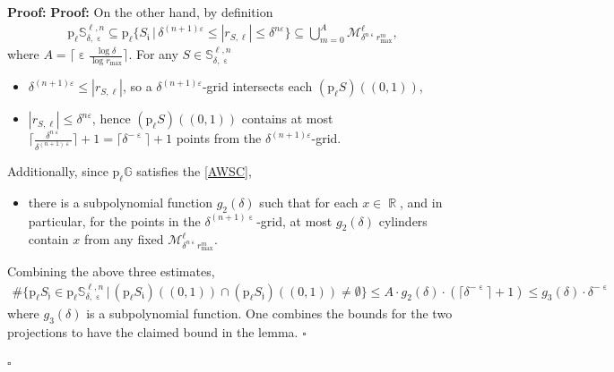 \documentclass[a4paper, 11pt]{article}
\newenvironment{Proof}{\noindent \textbf{Proof:}}{\hfill$\square$\\}
\DeclareMathOperator{\R}{\mathbb{R}}
\DeclareMathOperator{\iii}{\mathfrak{i}}
\DeclareMathOperator{\jjj}{\mathfrak{j}}
\DeclareMathOperator{\eps}{\varepsilon}
\numberwithin{equation}{section}
\theoremstyle{plain}
\theoremstyle{remark}
\theoremstyle{definition}
\begin{document}
\begin{Proof}
\begin{Proof}
On the other hand, by definition
\begin{align*}
\mathrm{p}_{\ell}\mathbb{S}_{\delta, \eps}^{\ell, n} \subseteq \mathrm{p}_{\ell}\big\{S_{\iii}\, \big|\, \delta^{(n+1)\varepsilon}\leq|r_{S,\ell}|\leq\delta^{n\varepsilon} \big\} \subseteq \bigcup_{m = 0}^{A}\mathcal{M}_{\delta^{n\eps}r_{\max}^m}^\ell,
\end{align*}
where $A = \big\lceil\eps\frac{\log \delta}{\log r_{\max}}\big\rceil$. For any $S \in \mathbb{S}_{\delta, \eps}^{\ell, n}$
\begin{itemize}
\item $\delta^{(n+1)\varepsilon} \leq|r_{S,\ell}|$, so a $\delta^{(n+1)\varepsilon}$-grid intersects each $(\mathrm{p}_\ell S)((0,1))$,
\item $|r_{S,\ell}|\leq\delta^{n\varepsilon}$, hence $(\mathrm{p}_\ell S)((0,1))$ contains at most $\lceil\frac{\delta^{n\eps}}{\delta^{(n+1)\eps}}\rceil+1 = \lceil\delta^{-\eps}\rceil+1$ points from the $\delta^{(n+1)\varepsilon}$-grid.
\end{itemize}
Additionally, since $\mathrm{p}_{\ell}\mathbb{G}$ satisfies the \ref{AWSC},
\begin{itemize}
\item there is a subpolynomial function $g_2(\delta)$ such that for each $x\in \R$, and in particular, for the points in the $\delta^{(n+1)\eps}$-grid, at most $g_2(\delta)$ cylinders contain $x$ from any fixed $\mathcal{M}_{\delta^{n\eps}r_{\max}^m}^\ell$.
\end{itemize}
Combining the above three estimates,
\begin{align*}
\#\big\{\mathrm{p}_\ell S_{\jjj} \in \mathrm{p}_{\ell}\mathbb{S}_{\delta, \eps}^{\ell, n}\, \big|\, (\mathrm{p}_\ell S_{\iii})((0,1)) \cap (\mathrm{p}_\ell S_{\jjj})((0,1)) \neq \emptyset \big\} \leq A \cdot g_2(\delta) \cdot (\lceil\delta^{-\eps}\rceil+1) \leq g_3(\delta) \cdot \delta^{-\eps}
\end{align*}
where $g_3(\delta)$ is a subpolynomial function. One combines the bounds for the two projections to have the claimed bound in the lemma.
\end{Proof}


\end{Proof}
\end{document}
